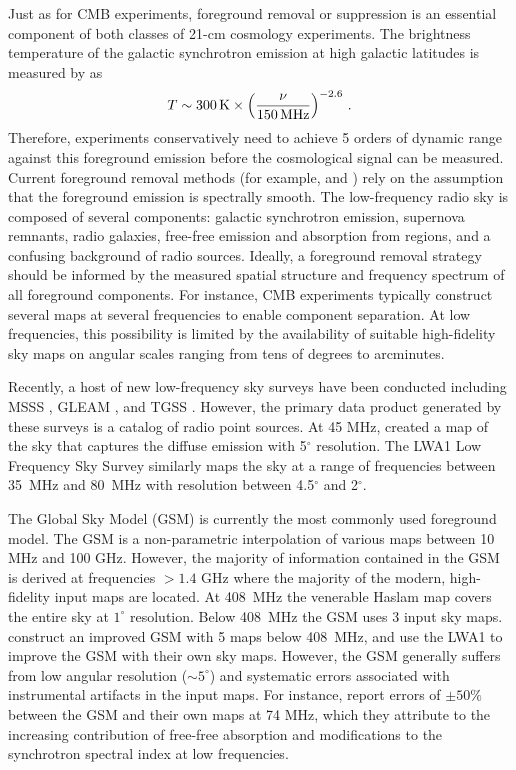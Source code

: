 \documentclass[twocolumn]{aastex61}
\newcommand{\revision}[1]{\textcolor{red}{\textbf{#1}}}
\begin{document}
Just as for CMB experiments, foreground removal or suppression is an essential component of both
classes of 21-cm cosmology experiments. The brightness temperature of the galactic synchrotron
emission at high galactic latitudes is measured by \revision{\citet{2017MNRAS.464.4995M}} as
\revision{\begin{equation}
    T \sim 300\,{\rm K} \times \left(\frac{\nu}{150\,{\rm MHz}}\right)^{-2.6}\,.
\end{equation}}
Therefore, experiments conservatively need to achieve 5 orders of dynamic range against this
foreground emission before the cosmological signal can be measured. Current foreground removal
methods (for example, \citealt{2012ApJ...756..165P} and \citealt{2013MNRAS.429..165C}) rely on the
assumption that the foreground emission is spectrally smooth. The low-frequency radio sky is
composed of several components: galactic synchrotron emission, supernova remnants, radio galaxies,
free-free emission and absorption from  regions, and a confusing background of radio
sources.  Ideally, a foreground removal strategy should be informed by the measured spatial
structure and frequency spectrum of all foreground components. For instance, CMB experiments
typically construct several maps at several frequencies to enable component separation.  At low
frequencies, this possibility is limited by the availability of suitable high-fidelity sky maps on
angular scales ranging from tens of degrees to arcminutes.

Recently, a host of new low-frequency sky surveys have been conducted including MSSS
\citep{2015A&A...582A.123H}, GLEAM \citep{2015PASA...32...25W}, and TGSS
\citep{2017A&A...598A..78I}. However, the primary data product generated by these surveys is a
catalog of radio point sources. At 45 MHz, \citet{2011A&A...525A.138G} created a map of the sky that
captures the diffuse emission with 5$^\circ$ resolution.  The LWA1 Low Frequency Sky Survey
\citep{2017MNRAS.469.4537D} similarly maps the sky at a range of frequencies between 35~MHz and
80~MHz with resolution between 4.5$^\circ$ and 2$^\circ$.

The Global Sky Model (GSM) \citep{2008MNRAS.388..247D} is currently the most commonly used
foreground model. The GSM is a non-parametric interpolation of various maps between 10 MHz and 100
GHz. However, the majority of information contained in the GSM is derived at frequencies $>1.4$ GHz
where the majority of the modern, high-fidelity input maps are located. At 408~MHz the venerable
Haslam map \citep{1981A&A...100..209H, 1982A&AS...47....1H} covers the entire sky at $1^\circ$
resolution.  Below 408~MHz the GSM uses 3 input sky maps. \citet{2017MNRAS.464.3486Z} construct an
improved GSM with 5 maps below 408~MHz, and \citet{2017MNRAS.469.4537D} use the LWA1 to improve the
GSM with their own sky maps.  However, the GSM generally suffers from low angular resolution ($\sim
5^\circ$) and systematic errors associated with instrumental artifacts in the input maps.  For
instance, \citet{2017MNRAS.469.4537D} report errors of $\pm 50\%$ between the GSM and their own maps
at 74 MHz, which they attribute to the increasing contribution of free-free absorption and
modifications to the synchrotron spectral index at low frequencies.
\end{document}

